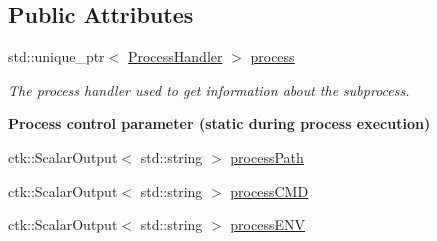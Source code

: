 \subsection*{Public Attributes}
\begin{DoxyCompactItemize}
\item 
std\+::unique\+\_\+ptr$<$ \hyperlink{structProcessHandler}{Process\+Handler} $>$ \hyperlink{structProcessControlModule_aba3b3b45eaab1c831c9359d0db4f585e}{process}\hypertarget{structProcessControlModule_aba3b3b45eaab1c831c9359d0db4f585e}{}\label{structProcessControlModule_aba3b3b45eaab1c831c9359d0db4f585e}

\begin{DoxyCompactList}\small\item\em The process handler used to get information about the subprocess. \end{DoxyCompactList}\end{DoxyCompactItemize}
\begin{Indent}{\bf Process control parameter (static during process execution)}\par
\begin{DoxyCompactItemize}
\item 
ctk\+::\+Scalar\+Output$<$ std\+::string $>$ \hyperlink{structProcessControlModule_a3910651f5e7ce2762a183b5917e0c1a2}{process\+Path}
\item 
ctk\+::\+Scalar\+Output$<$ std\+::string $>$ \hyperlink{structProcessControlModule_a6e686bbcec279a721b28814b645db76a}{process\+C\+MD}
\item 
ctk\+::\+Scalar\+Output$<$ std\+::string $>$ \hyperlink{structProcessControlModule_a6e9d90425d057f951f0b5c7a159bde30}{process\+E\+NV}
\end{DoxyCompactItemize}
\end{Indent}
